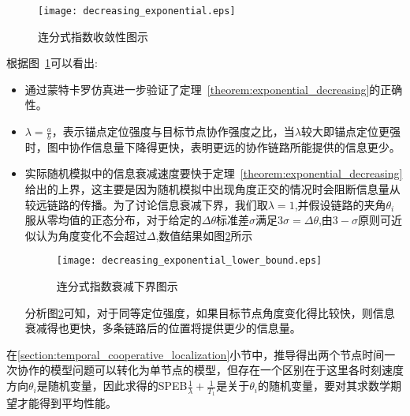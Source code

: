 \begin{figure}
  \centering
  \texttt{[image: decreasing\_exponential.eps]}
  \caption{连分式指数收敛性图示}\label{fig:continuous_fraction_exponential}
\end{figure}
根据图~\ref{fig:continuous_fraction_exponential}可以看出:
\begin{itemize}
\item 通过蒙特卡罗仿真进一步验证了定理~\ref{theorem:exponential_decreasing}的正确性。
\item $\lambda=\frac{a}{b}$，表示锚点定位强度与目标节点协作强度之比，当$\lambda$较大即锚点定位更强时，图中协作信息量下降得更快，表明更远的协作链路所能提供的信息更少。
\item 实际随机模拟中的信息衰减速度要快于定理~\ref{theorem:exponential_decreasing}给出的上界，这主要是因为随机模拟中出现角度正交的情况时会阻断信息量从较远链路的传播。为了讨论信息衰减下界，我们取$\lambda=1$,并假设链路的夹角$\theta_i$服从零均值的正态分布，对于给定的$\Delta \theta$标准差$\sigma$满足$3\sigma=\Delta \theta$,由$3-\sigma$原则可近似认为角度变化不会超过$\Delta$,数值结果如图\ref{fig:continuous_fraction_exponential_lower_bound}所示
    \begin{figure}
      \centering
      \texttt{[image: decreasing\_exponential\_lower\_bound.eps]}
      \caption{连分式指数衰减下界图示}\label{fig:continuous_fraction_exponential_lower_bound}
    \end{figure}

    分析图\ref{fig:continuous_fraction_exponential_lower_bound}可知，对于同等定位强度，如果目标节点角度变化得比较快，则信息衰减得也更快，多条链路后的位置将提供更少的信息量。
\end{itemize}
\begin{remark}
在\ref{section:temporal_cooperative_localization}小节中，推导得出两个节点时间一次协作的模型问题可以转化为单节点的模型，但存在一个区别在于这里各时刻速度方向$\theta_i$是随机变量，因此求得的SPEB$\frac{1}{\lambda}+\frac{1}{T_1}$是关于$\theta_i$的随机变量，要对其求数学期望才能得到平均性能。


\end{remark}
